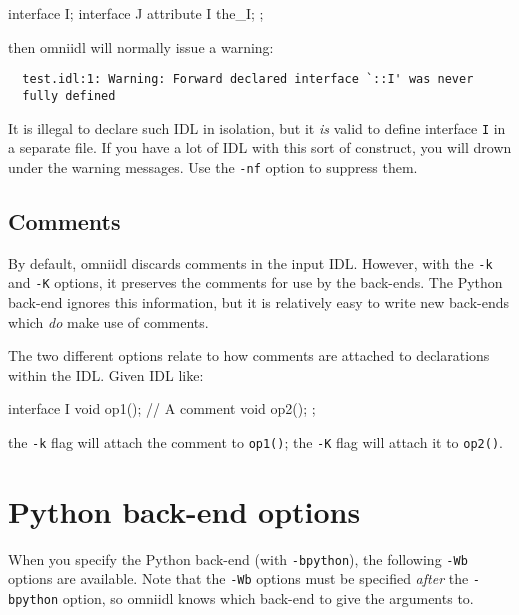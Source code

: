 \documentclass[11pt,twoside,a4paper]{book}
\newcommand{\intf}[1]{\texttt{#1}}
\newcommand{\op}[1]{\texttt{#1()}}
\newcommand{\cmdline}[1]{\texttt{#1}}
\begin{document}
\begin{idllisting}
interface I;
interface J {
  attribute I the_I;
};
\end{idllisting}

\noindent then omniidl will normally issue a warning:

{\small
\begin{verbatim}
  test.idl:1: Warning: Forward declared interface `::I' was never
  fully defined
\end{verbatim}
}

\noindent It is illegal to declare such IDL in isolation, but it
\emph{is} valid to define interface \intf{I} in a separate file. If
you have a lot of IDL with this sort of construct, you will drown
under the warning messages. Use the \cmdline{-nf} option to suppress
them.


\subsection{Comments}

By default, omniidl discards comments in the input IDL. However, with
the \cmdline{-k} and \cmdline{-K} options, it preserves the comments
for use by the back-ends. The Python back-end ignores this
information, but it is relatively easy to write new back-ends which
\emph{do} make use of comments.

The two different options relate to how comments are attached to
declarations within the IDL. Given IDL like:

\begin{idllisting}
interface I {
  void op1();
  // A comment
  void op2();
};
\end{idllisting}

\noindent the \cmdline{-k} flag will attach the comment to \op{op1};
the \cmdline{-K} flag will attach it to \op{op2}.



\section{Python back-end options}
\label{sec:Wbglobal}

When you specify the Python back-end (with \cmdline{-bpython}), the
following \cmdline{-Wb} options are available. Note that the
\cmdline{-Wb} options must be specified \emph{after} the
\cmdline{-bpython} option, so omniidl knows which back-end to give the
arguments to.
\end{document}

